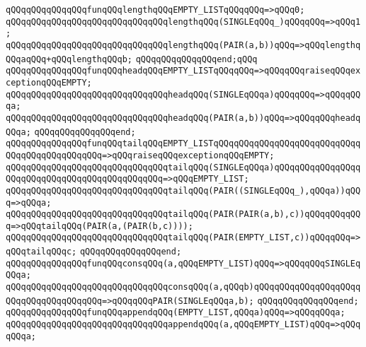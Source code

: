 \verb|qQQqqQQqqQQqqQQqfunqQQqlengthqQQqEMPTY_LISTqQQqqQQq=>qQQq0;|\newline
\verb|qQQqqQQqqQQqqQQqqQQqqQQqqQQqqQQqlengthqQQq(SINGLEqQQq_)qQQqqQQq=>qQQq1;|\newline
\verb|qQQqqQQqqQQqqQQqqQQqqQQqqQQqqQQqlengthqQQq(PAIR(a,b))qQQq=>qQQqlengthqQQqaqQQq+qQQqlengthqQQqb;|\newline
\verb|qQQqqQQqqQQqqQQqend;qQQq|\newline
\newline
\verb|qQQqqQQqqQQqqQQqfunqQQqheadqQQqEMPTY_LISTqQQqqQQq=>qQQqqQQqraiseqQQqexceptionqQQqEMPTY;|\newline
\verb|qQQqqQQqqQQqqQQqqQQqqQQqqQQqqQQqheadqQQq(SINGLEqQQqa)qQQqqQQq=>qQQqqQQqa;|\newline
\verb|qQQqqQQqqQQqqQQqqQQqqQQqqQQqqQQqheadqQQq(PAIR(a,b))qQQq=>qQQqqQQqheadqQQqa;|\newline
\verb|qQQqqQQqqQQqqQQqend;|\newline
\newline
\verb|qQQqqQQqqQQqqQQqfunqQQqtailqQQqEMPTY_LISTqQQqqQQqqQQqqQQqqQQqqQQqqQQqqQQqqQQqqQQqqQQqqQQq=>qQQqraiseqQQqexceptionqQQqEMPTY;|\newline
\verb|qQQqqQQqqQQqqQQqqQQqqQQqqQQqqQQqtailqQQq(SINGLEqQQqa)qQQqqQQqqQQqqQQqqQQqqQQqqQQqqQQqqQQqqQQqqQQqqQQq=>qQQqEMPTY_LIST;|\newline
\verb|qQQqqQQqqQQqqQQqqQQqqQQqqQQqqQQqtailqQQq(PAIR((SINGLEqQQq_),qQQqa))qQQq=>qQQqa;|\newline
\verb|qQQqqQQqqQQqqQQqqQQqqQQqqQQqqQQqtailqQQq(PAIR(PAIR(a,b),c))qQQqqQQqqQQq=>qQQqtailqQQq(PAIR(a,(PAIR(b,c))));|\newline
\verb|qQQqqQQqqQQqqQQqqQQqqQQqqQQqqQQqtailqQQq(PAIR(EMPTY_LIST,c))qQQqqQQq=>qQQqtailqQQqc;|\newline
\verb|qQQqqQQqqQQqqQQqend;|\newline
\newline
\verb|qQQqqQQqqQQqqQQqfunqQQqconsqQQq(a,qQQqEMPTY_LIST)qQQq=>qQQqqQQqSINGLEqQQqa;|\newline
\verb|qQQqqQQqqQQqqQQqqQQqqQQqqQQqqQQqconsqQQq(a,qQQqb)qQQqqQQqqQQqqQQqqQQqqQQqqQQqqQQqqQQqqQQq=>qQQqqQQqPAIR(SINGLEqQQqa,b);|\newline
\verb|qQQqqQQqqQQqqQQqend;|\newline
\newline
\verb|qQQqqQQqqQQqqQQqfunqQQqappendqQQq(EMPTY_LIST,qQQqa)qQQq=>qQQqqQQqa;|\newline
\verb|qQQqqQQqqQQqqQQqqQQqqQQqqQQqqQQqappendqQQq(a,qQQqEMPTY_LIST)qQQq=>qQQqqQQqa;|\newline
